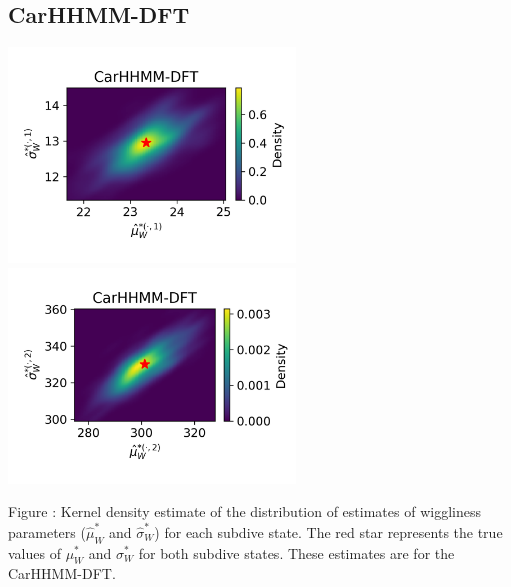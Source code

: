 \documentclass{article}
\begin{document}
        \subsection{CarHHMM-DFT}
        \begin{center}
        \includegraphics[width=3in]{../Plots/hhmm_FV_MLE_density_FoVeDBA_0_0.png}
        \includegraphics[width=3in]{../Plots/hhmm_FV_MLE_density_FoVeDBA_0_1.png}
        \end{center}
        
        \noindent Figure : Kernel density estimate of the distribution of estimates of wiggliness parameters ($\hat \mu^*_W$ and $\hat \sigma^*_W$) for each subdive state. The red star represents the true values of $\mu^*_W$ and $\sigma^*_W$ for both subdive states. These estimates are for the CarHHMM-DFT.
        \addtocounter{fignum}{1}
        
\end{document}
